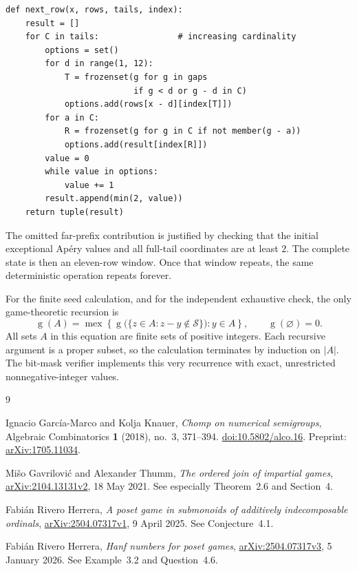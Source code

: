 \documentclass[11pt,letterpaper]{article}
\numberwithin{equation}{section}
\theoremstyle{definition}
\newcommand{\Sg}{\mathcal S}
\newcommand{\Gr}{\operatorname{g}}
\newcommand{\mex}{\operatorname{mex}}
\begin{document}
\begin{lstlisting}
def next_row(x, rows, tails, index):
    result = []
    for C in tails:                # increasing cardinality
        options = set()
        for d in range(1, 12):
            T = frozenset(g for g in gaps
                          if g < d or g - d in C)
            options.add(rows[x - d][index[T]])
        for a in C:
            R = frozenset(g for g in C if not member(g - a))
            options.add(result[index[R]])
        value = 0
        while value in options:
            value += 1
        result.append(min(2, value))
    return tuple(result)
\end{lstlisting}

The omitted far-prefix contribution is justified by checking that the
initial exceptional Ap\'ery values and all full-tail coordinates are at
least $2$. The complete state is then an eleven-row window. Once that
window repeats, the same deterministic operation repeats forever.

For the finite seed calculation, and for the independent exhaustive check,
the only game-theoretic recursion is
\begin{equation}\label{eq:literal-mex}
 \Gr(A)=\mex\left\{
 \Gr\bigl(\{z\in A:z-y\notin\Sg\}\bigr):y\in A
 \right\},\qquad \Gr(\varnothing)=0.
\end{equation}
All sets $A$ in this equation are finite sets of positive integers. Each
recursive argument is a proper subset, so the calculation terminates by
induction on $|A|$. The bit-mask verifier implements this very recurrence
with exact, unrestricted nonnegative-integer values.

\begin{thebibliography}{9}

Ignacio Garc\'ia-Marco and Kolja Knauer,
\emph{Chomp on numerical semigroups},
Algebraic Combinatorics \textbf{1} (2018), no.~3, 371--394.
\href{https://doi.org/10.5802/alco.16}{doi:10.5802/alco.16}.
Preprint: \href{https://arxiv.org/abs/1705.11034}{arXiv:1705.11034}.

Mi\v{s}o Gavrilovi\'c and Alexander Thumm,
\emph{The ordered join of impartial games},
\href{https://arxiv.org/abs/2104.13131v2}{arXiv:2104.13131v2},
18 May 2021. See especially Theorem~2.6 and Section~4.

Fabi\'an Rivero Herrera,
\emph{A poset game in submonoids of additively indecomposable ordinals},
\href{https://arxiv.org/abs/2504.07317v1}{arXiv:2504.07317v1},
9 April 2025. See Conjecture~4.1.

Fabi\'an Rivero Herrera,
\emph{Hanf numbers for poset games},
\href{https://arxiv.org/abs/2504.07317v3}{arXiv:2504.07317v3},
5 January 2026. See Example~3.2 and Question~4.6.

\end{thebibliography}
\end{document}
